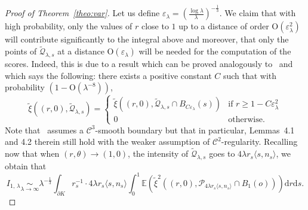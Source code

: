 \documentclass[AHL,Unicode,longabstracts,published]{cedram}
\newcommand{\cC}{\mathcal{C}}
\newcommand{\cP}{\mathcal{P}}
\newcommand{\cQ}{\mathcal{Q}}
\newcommand{\la}{\lambda}
\newcommand{\dd}{\mathrm{d}}
\newcommand{\Odd}{\mathrm{O}}
\newcommand{\E}{\mathbb{E}}
\newcommand{\noi}{\noindent}
\newcommand*{\MK}{\mkern 2mu}
\begin{document}
\begin{proof}[{Proof of Theorem~\ref{theo:var}}]
Let us define $\varepsilon_\la=(\tfrac{\log \lambda}{\lambda})^{-\frac13}$. We claim that with high probability, only the values of $r$ close to $1$ up to a distance of order $\Odd(\varepsilon_\lambda^2)$ will contribute significantly to the integral above and moreover, that only the points of $\widetilde{\cQ}_{\la,s}$ at a distance $\Odd(\varepsilon_\lambda)$ will be needed for the computation of the scores. Indeed, this is due to a result which can be proved analogously to~\cite[Lemma~4.1$\MK$(a), Lemma~4.2]{cy14} and which says the following: there exists a positive constant $C$ such that with probability $(1-\Odd(\lambda^{-8}))$,
\[
\widetilde{\xi}\left((r,0),\widetilde{\cQ}_{\la,s}\right)=
\begin{cases}
\widetilde{\xi}\left((r,0),\widetilde{\cQ}_{\la,s}\cap B_{C\varepsilon_\la}(s)\right)& \text{if }r\ge 1-C\varepsilon_\la^2\\
0 & \text{otherwise}.
\end{cases}
\]
Note that~\cite{cy14} assumes a $\cC^3$-smooth boundary but that in particular, Lemmas~4.1 and 4.2 therein still hold with the weaker assumption of $\cC^2$-regularity. Recalling now that when $(r,\theta)\to (1,0)$, the intensity of $\widetilde{\cQ}_{\la,s}$ goes to $4\lambda r_s\langle s,n_s\rangle$, we obtain that
\begin{equation}\label{eq:I1lambdaok}
I_{1,\,\lambda} \underset{\lambda\to\infty}{\sim}\lambda^{-\frac13}
\int_{\partial K}r_s^{-1}\cdot 4\lambda r_s\langle s,n_s\rangle
\int_{0}^1\E\left(\widetilde{\xi}^2\left((r,0),\cP_{4\lambda r_s\langle s,n_s\rangle}\cap B_1(o)\right)\right)\dd r \dd s.
\end{equation}


\end{proof}
\end{document}

